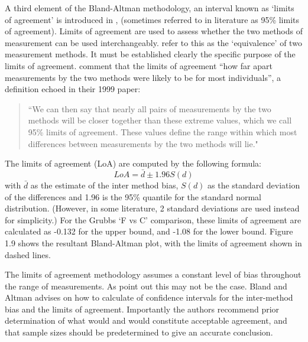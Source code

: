 \documentclass[12pt, a4paper]{report}
\theoremstyle{plain}
\theoremstyle{definition}
\theoremstyle{remark}
\begin{document}
	A third element of the Bland-Altman methodology, an interval known
	as `limits of agreement' is introduced in \citet*{BA86},
	(sometimes referred to in literature as 95\% limits of agreement).
	Limits of agreement are used to assess whether the two methods of
	measurement can be used interchangeably. \citet{BA86} refer to
	this as the `equivalence' of two measurement methods. It must be
	established clearly the specific purpose of the limits of
	agreement. \citet*{BA95} comment that the limits of agreement
	``how far apart measurements by the two methods were likely to be
	for most individuals'', a definition echoed in their 1999 paper:
	
	\begin{quote} ``We can then say that nearly all pairs
		of measurements by the two methods will be closer together than
		these extreme values, which we call 95\% limits of agreement.
		These values define the range within which most differences
		between measurements by the two methods will lie."
	\end{quote}
	
	The limits of agreement (LoA) are computed by the following
	formula:
	\begin{equation}
	LoA = \bar{d} \pm 1.96 S(d)
	\end{equation}
	with $\bar{d}$ as the estimate of the inter method bias, $S(d)$ as
	the standard deviation of the differences and 1.96 is the 95\%
	quantile for the standard normal distribution. (However, in some
	literature, 2 standard deviations are used instead for
	simplicity.) For the Grubbs `F vs C' comparison, these limits of
	agreement are calculated as -0.132 for the upper bound, and -1.08
	for the lower bound. Figure 1.9 shows the resultant Bland-Altman
	plot, with the limits of agreement shown in dashed lines.
	
	
	The limits of agreement methodology assumes a constant level of
	bias throughout the range of measurements. As \citet*{BA86} point
	out this may not be the case. Bland and Altman advises on how to
	calculate of confidence intervals for the inter-method bias and
	the limits of agreement. Importantly the authors recommend prior
	determination of what would and would constitute acceptable
	agreement, and that sample sizes should be predetermined to give
	an accurate conclusion.
	
\end{document}
